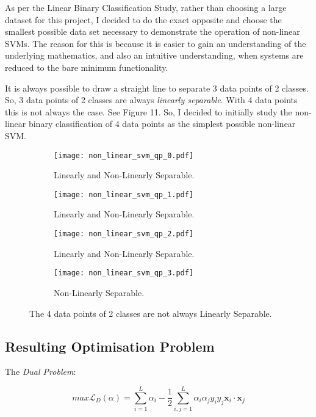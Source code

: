 \documentclass[10pt, a4paper,reqno]{amsart}
\begin{document}
As per the Linear Binary Classification Study, rather than choosing a large dataset for this project, I decided to do the exact opposite and choose the smallest possible data set necessary to demonstrate the operation of non-linear SVMs. The reason for this is because it is easier to gain an understanding of the underlying mathematics, and also an intuitive understanding, when systems are reduced to the bare minimum functionality.

It is always possible to draw a straight line to separate 3 data points of 2 classes. So, 3 data points of 2 classes are always \emph{linearly separable}. With 4 data points this is not always the case. See Figure 11. So, I decided to initially study the non-linear binary classification of 4 data points as the simplest possible non-linear SVM.

\begin{figure}[H]
	\centering	
	\begin{subfigure}{0.5\textwidth}
		\centering
		\texttt{[image: non\_linear\_svm\_qp\_0.pdf]}
		\caption{Linearly and Non-Linearly Separable.}
	\end{subfigure}%
	\begin{subfigure}{0.5\textwidth}
		\centering
		\texttt{[image: non\_linear\_svm\_qp\_1.pdf]}
		\caption{Linearly and Non-Linearly Separable.}
	\end{subfigure}
	\begin{subfigure}{0.5\textwidth}
		\centering
		\texttt{[image: non\_linear\_svm\_qp\_2.pdf]}
		\caption{Linearly and Non-Linearly Separable.}
	\end{subfigure}%
	\begin{subfigure}{0.5\textwidth}
		\centering
		\texttt{[image: non\_linear\_svm\_qp\_3.pdf]}
		\caption{Non-Linearly Separable.}
	\end{subfigure}
	\caption{The 4 data points of 2 classes are not always Linearly Separable.}
\end{figure}

\subsection{Resulting Optimisation Problem}

The \emph{Dual Problem}:

\begin{equation}
max\mathcal{L}_D(\alpha) = \sum_{i=1}^{L}\alpha_i - \frac{1}{2}\sum_{i,j=1}^{L}\alpha_i \alpha_j y_i y_j\mathbf{x}_i\cdot\mathbf{x}_j
\end{equation}
\end{document}
